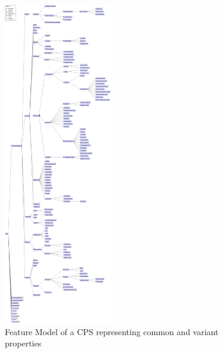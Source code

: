 \documentclass[final]{include/MPM4CPS/MPM4CPS-Report} %
\newcommand{\p}[1]{\textsf{#1}}
\newcommand{\TODOINLINE}[2][N.N.]{{\todo[inline]{\footnotesize TODO[#1]: #2}}}
\begin{document}
\begin{figure}[!htb]
\includegraphics[width=0.42\textwidth]{figures/cps-ontology-constituent.png}  %
\caption{Feature Model of a CPS representing common and variant properties}
\label{fig:feature_model_cps_constituent}
\end{figure}



\newcommand{\CPSCyberPart}{\p{Cyber}\xspace}
\newcommand{\CPSPhysicalPart}{\p{Physical}\xspace}

\end{document}
